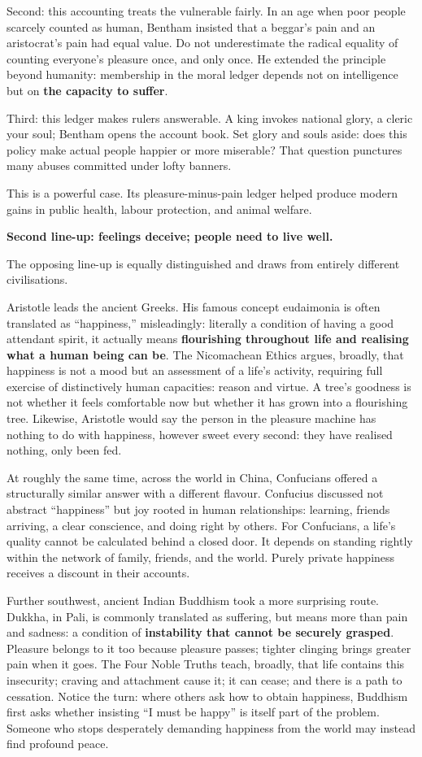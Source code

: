 Second: this accounting treats the vulnerable fairly. In an age when poor people scarcely counted as human, Bentham insisted that a beggar's pain and an aristocrat's pain had equal value. Do not underestimate the radical equality of counting everyone's pleasure once, and only once. He extended the principle beyond humanity: membership in the moral ledger depends not on intelligence but on \textbf{the capacity to suffer}.

Third: this ledger makes rulers answerable. A king invokes national glory, a cleric your soul; Bentham opens the account book. Set glory and souls aside: does this policy make actual people happier or more miserable? That question punctures many abuses committed under lofty banners.

This is a powerful case. Its pleasure-minus-pain ledger helped produce modern gains in public health, labour protection, and animal welfare.

\textbf{Second line-up: feelings deceive; people need to live well.}

The opposing line-up is equally distinguished and draws from entirely different civilisations.

Aristotle leads the ancient Greeks. His famous concept eudaimonia is often translated as ``happiness,'' misleadingly: literally a condition of having a good attendant spirit, it actually means \textbf{flourishing throughout life and realising what a human being can be}. The Nicomachean Ethics argues, broadly, that happiness is not a mood but an assessment of a life's activity, requiring full exercise of distinctively human capacities: reason and virtue. A tree's goodness is not whether it feels comfortable now but whether it has grown into a flourishing tree. Likewise, Aristotle would say the person in the pleasure machine has nothing to do with happiness, however sweet every second: they have realised nothing, only been fed.

At roughly the same time, across the world in China, Confucians offered a structurally similar answer with a different flavour. Confucius discussed not abstract ``happiness'' but joy rooted in human relationships: learning, friends arriving, a clear conscience, and doing right by others. For Confucians, a life's quality cannot be calculated behind a closed door. It depends on standing rightly within the network of family, friends, and the world. Purely private happiness receives a discount in their accounts.

Further southwest, ancient Indian Buddhism took a more surprising route. Dukkha, in Pali, is commonly translated as suffering, but means more than pain and sadness: a condition of \textbf{instability that cannot be securely grasped}. Pleasure belongs to it too because pleasure passes; tighter clinging brings greater pain when it goes. The Four Noble Truths teach, broadly, that life contains this insecurity; craving and attachment cause it; it can cease; and there is a path to cessation. Notice the turn: where others ask how to obtain happiness, Buddhism first asks whether insisting ``I must be happy'' is itself part of the problem. Someone who stops desperately demanding happiness from the world may instead find profound peace.

